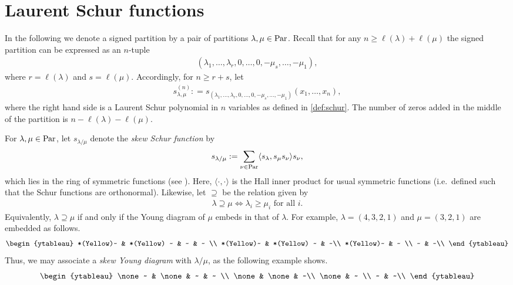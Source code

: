 \documentclass[11pt]{amsart}
\begin{document}
\section{Laurent Schur functions} \label{sec:lscf}

In the following we denote a signed partition by a pair of partitions $\lambda, \mu \in \mathrm{Par}$. Recall that for any \(n \geq \ell(\lambda) + \ell(\mu)\) the signed partition can be expressed as an \(n\)-tuple
\begin{align*}
    (\lambda_1 ,\dots , \lambda_r, 0 , \dots, 0 , -\mu_s , \dots, -\mu _1),
\end{align*}
where $r = \ell(\lambda) $ and $s = \ell (\mu)$. Accordingly, for $n \geq r+s$, let  \begin{align*}
        s_{\lambda,\mu}^{(n)} : = s_{(\lambda_1 ,\dots , \lambda_r, 0 , \dots, 0 , -\mu_s , \dots, -\mu _1)} (x_1, \dots,x_n),
    \end{align*}
where the right hand side is a Laurent Schur polynomial in $n$ variables as defined in \cref{def:schur}. The number of zeros added in the middle of the partition is $n - \ell(\lambda) - \ell(\mu)$.

For $\lambda, \mu \in \mathrm{Par}$, let $s_{\lambda/\mu}$ denote the \emph{skew Schur function} by
    \begin{align}
    s_{\lambda/\mu}:=\sum_{\nu \in \mathrm{Par}}\langle s_{\lambda}, s_\mu s_\nu \rangle s_\nu,
    \end{align}
which lies in the ring of symmetric functions (see \cite[Ch.~I, \S5, Eq.~(5.3)]{Mac15}). Here, $\langle \cdot , \cdot \rangle$ is the Hall inner product for usual symmetric functions (i.e.\ defined such that the Schur functions are orthonormal). Likewise, let $\supseteq$ be the relation given by
\begin{align}
    \lambda \supseteq \mu \iff \lambda_i \geq \mu_i \text{ for all } i. \label{eq:cont}
\end{align}
Equivalently,  $\lambda \supseteq \mu$ if and only if the Young diagram of $\mu$ embeds in that of $\lambda$. For example, $\lambda=(4, 3, 2, 1)$ and $\mu=(3, 2, 1)$ are embedded as follows.
\[\begin{ytableau}
    *(Yellow)~ & *(Yellow) ~ &  ~ & ~ \\
    *(Yellow)~ & *(Yellow) ~ & ~\\
    *(Yellow)~ & ~ \\
    ~ & ~\\
\end{ytableau}\]
 Thus, we may associate a \emph{skew Young diagram} with $\lambda/\mu$, as the following example shows.
\[\begin{ytableau}
    \none~ & \none & ~ & ~ \\
    \none & \none & ~\\
    \none  & ~ \\
    ~ & ~\\
\end{ytableau}\]
\end{document}
